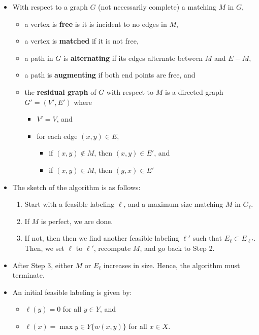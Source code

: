 \documentclass[10pt]{article}
\begin{document}
  \begin{itemize}
    \item With respect to a graph $G$ (not necessarily complete) a matching $M$ in $G$,
    \begin{itemize}
      \item a vertex is {\bf free} is it is incident to no edges in $M$,
      \item a vertex is {\bf matched} if it is not free,
      \item a path in $G$ is {\bf alternating} if its edges alternate between $M$ and $E - M$,
      \item a path is {\bf augmenting} if both end points are free, and
      \item the {\bf residual graph} of $G$ with respect to $M$ is a directed graph $G' = (V', E')$ where      
      \begin{itemize}
        \item $V' = V$, and
        \item for each edge $(x,y) \in E$,
        \begin{itemize}
          \item if $(x,y) \not\in M$, then $(x,y) \in E'$, and
          \item if $(x,y) \in M$, then $(y,x) \in E'$
        \end{itemize}
      \end{itemize}
    \end{itemize}

    \item The sketch of the algorithm is as follows:
    \begin{enumerate}
      \item Start with a feasible labeling $\ell$, and a maximum size matching $M$ in $G_\ell$.

      \item If $M$ is perfect, we are done. 

      \item If not, then then we find another feasible labeling $\ell'$ such that $E_\ell \subset E_{\ell'}$.\\
      Then, we set $\ell$ to $\ell'$, recompute $M$, and go back to Step 2.      
    \end{enumerate}

    \item After Step 3, either $M$ or $E_\ell$ increases in size. Hence, the algorithm must terminate.

    \item An initial feasible labeling is given by:
    \begin{itemize}
      \item $\ell(y) = 0$ for all $y \in Y$, and
      \item $\ell(x) = \max{y\in Y} \{ w(x,y) \}$ for all $x \in X$.
    \end{itemize}


\end{itemize}
\end{document}

